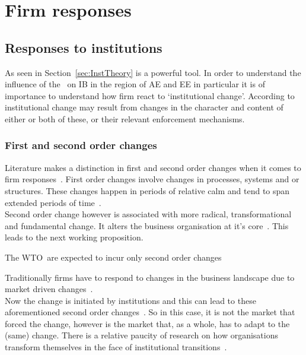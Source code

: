 \section{Firm responses}\label{sec:firmResponses}

\subsection{Responses to institutions}
As seen \inth in Section~\ref{sec:InstTheory} is a powerful tool.
In order to understand the influence of the \wto~on IB in the region of \gls{AE} and \gls{EE} in particular it is of importance to understand how firm react to `institutional change'.
According to~\cite{North:1990vl} institutional change may result from changes in the character and content of either or both of these, or their relevant enforcement mechanisms.

\subsubsection{First and second order changes}
Literature makes a distinction in first and second order changes when it comes to firm responses~\citep{Meyer:1995td}.
First order changes involve changes in processes, systems and or structures. These changes happen in periods of relative calm and tend to span extended periods of time~\citep{Dutton:1991gk,FoxWolfgramm:1998vu,Tushman:1985}.\\
Second order change however is associated with more radical, transformational and fundamental change.
It alters the business organisation at it's core~\citep{Meyer:1982ug,Meyer:1995td,Tushman:1985,Newman:2000fc}.
This leads to the next working proposition.

\begin{WP}\label{WP:WTO_rr_2nd-change}
The WTO~\rr are expected to incur only second order changes 
\end{WP}
Traditionally firms have to respond to changes in the business landscape due to market driven changes~\citep{Chittoor:2008cj}.\\
Now the change is initiated by institutions and this can lead to these aforementioned second order changes~\citep{Chittoor:2009jh}.
So in this case, it is not the market that forced the change, however is the market that, as a whole, has to adapt to the (same) change.
There is a relative paucity of research on how organisations transform themselves in the face of institutional transitions~\citep{Chittoor:2008cj}.\\

